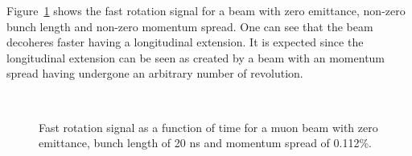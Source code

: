 Figure~\ref{fig:E_T_spread_frs} shows the fast rotation signal for a beam with zero emittance, non-zero bunch length and non-zero momentum spread.
One can see that the beam decoheres faster having a longitudinal extension. It is expected since the longitudinal extension can be seen as 
created by a beam with an momentum spread having undergone an arbitrary number of revolution.

\begin{figure}[bt]
\centering
{}\\
\caption{Fast rotation signal as a function of time for a muon beam with zero emittance, bunch length of 20 ns and momentum spread of 0.112\%.}
\label{fig:E_T_spread_frs}
\end{figure}
